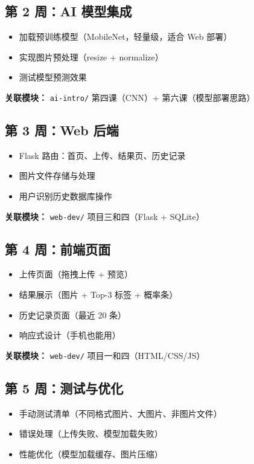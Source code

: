 \documentclass[a4paper,12pt]{ctexart}
\begin{document}
\subsection*{第 2 周：AI 模型集成}

\begin{itemize}
  \item 加载预训练模型（MobileNet，轻量级，适合 Web 部署）
  \item 实现图片预处理（resize + normalize）
  \item 测试模型预测效果
\end{itemize}

\textbf{关联模块：} \texttt{ai-intro/} 第四课（CNN）+ 第六课（模型部署思路）

\subsection*{第 3 周：Web 后端}

\begin{itemize}
  \item Flask 路由：首页、上传、结果页、历史记录
  \item 图片文件存储与处理
  \item 用户识别历史数据库操作
\end{itemize}

\textbf{关联模块：} \texttt{web-dev/} 项目三和四（Flask + SQLite）

\subsection*{第 4 周：前端页面}

\begin{itemize}
  \item 上传页面（拖拽上传 + 预览）
  \item 结果展示（图片 + Top-3 标签 + 概率条）
  \item 历史记录页面（最近 20 条）
  \item 响应式设计（手机也能用）
\end{itemize}

\textbf{关联模块：} \texttt{web-dev/} 项目一和四（HTML/CSS/JS）

\subsection*{第 5 周：测试与优化}

\begin{itemize}
  \item 手动测试清单（不同格式图片、大图片、非图片文件）
  \item 错误处理（上传失败、模型加载失败）
  \item 性能优化（模型加载缓存、图片压缩）
\end{itemize}
\end{document}
